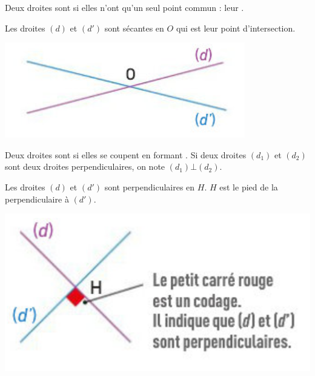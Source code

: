 \begin{mydef}
	Deux droites sont  si elles n'ont qu'un seul point commun : leur .
\end{mydef}


\begin{myex}
	\begin{multicols}{2}
		Les droites $(d)$ et $(d')$ sont sécantes en $O$ qui est leur point d'intersection.
		
		\includegraphics[scale=0.5]{img/sec}
	\end{multicols}
	
\end{myex}

\begin{mydef}
	Deux droites sont  si elles se coupent en formant . Si deux droites $(d_1)$ et $(d_2)$ sont deux droites perpendiculaires, on note $(d_1) \bot (d_2)$.
\end{mydef}

\begin{myex}
	\begin{multicols}{2}
		Les droites $(d)$ et $(d')$ sont perpendiculaires en $H$. $H$ est le pied de la perpendiculaire à $(d')$.
		
		\includegraphics[scale=0.6]{img/perp}
	\end{multicols}
	
\end{myex}


